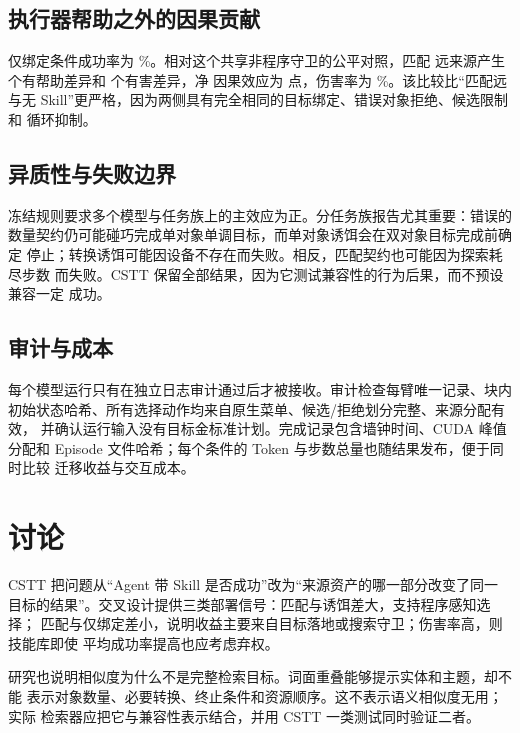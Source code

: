 \documentclass[10pt]{article}
\begin{document}
\subsection{执行器帮助之外的因果贡献}
仅绑定条件成功率为 \BindingRate\%。相对这个共享非程序守卫的公平对照，匹配
远来源产生 \HelpfulCount{} 个有帮助差异和 \HarmfulCount{} 个有害差异，净
因果效应为 \CausalNet{} 点，伤害率为 \HarmRate\%。该比较比“匹配远与无
Skill”更严格，因为两侧具有完全相同的目标绑定、错误对象拒绝、候选限制和
循环抑制。

\subsection{异质性与失败边界}

冻结规则要求多个模型与任务族上的主效应为正。分任务族报告尤其重要：错误的
数量契约仍可能碰巧完成单对象单调目标，而单对象诱饵会在双对象目标完成前确定
停止；转换诱饵可能因设备不存在而失败。相反，匹配契约也可能因为探索耗尽步数
而失败。CSTT 保留全部结果，因为它测试兼容性的行为后果，而不预设兼容一定
成功。

\subsection{审计与成本}
每个模型运行只有在独立日志审计通过后才被接收。审计检查每臂唯一记录、块内
初始状态哈希、所有选择动作均来自原生菜单、候选/拒绝划分完整、来源分配有效，
并确认运行输入没有目标金标准计划。完成记录包含墙钟时间、CUDA 峰值分配和
Episode 文件哈希；每个条件的 Token 与步数总量也随结果发布，便于同时比较
迁移收益与交互成本。

\section{讨论}
CSTT 把问题从“Agent 带 Skill 是否成功”改为“来源资产的哪一部分改变了同一
目标的结果”。交叉设计提供三类部署信号：匹配与诱饵差大，支持程序感知选择；
匹配与仅绑定差小，说明收益主要来自目标落地或搜索守卫；伤害率高，则技能库即使
平均成功率提高也应考虑弃权。

研究也说明相似度为什么不是完整检索目标。词面重叠能够提示实体和主题，却不能
表示对象数量、必要转换、终止条件和资源顺序。这不表示语义相似度无用；实际
检索器应把它与兼容性表示结合，并用 CSTT 一类测试同时验证二者。
\end{document}
